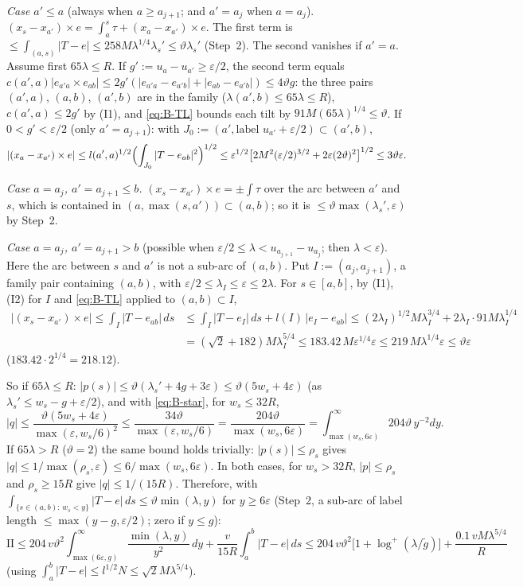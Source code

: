 \emph{Case $a'\le a$} (always when $a\ge a_{j+1}$; and $a'=a_j$ when $a=a_j$).
$(x_s-x_{a'})\times e=\int_a^s\tau+(x_a-x_{a'})\times e$. The first term is
$\le\int_{(a,s)}|T-e|\le258M\lambda^{1/4}\lambda_s'\le\vartheta\lambda_s'$ (Step~2). The second vanishes if $a'=a$. Assume first
$65\lambda\le R$. If $g':=u_a-u_{a'}\ge\varepsilon/2$, the second term equals
$c(a',a)|e_{a'a}\times e_{ab}|\le2g'(|e_{a'a}-e_{a'b}|+|e_{ab}-e_{a'b}|)\le4\vartheta g$: the three pairs $(a',a)$, $(a,b)$, $(a',b)$
are in the family ($\lambda(a',b)\le65\lambda\le R$), $c(a',a)\le2g'$ by (I1), and \eqref{eq:B-TL} bounds each tilt by
$91M(65\lambda)^{1/4}\le\vartheta$. If $0<g'<\varepsilon/2$ (only $a'=a_{j+1}$): with $J_0:=(a',\text{label }u_{a'}+\varepsilon/2)
\subset(a',b)$,
\[
|(x_a-x_{a'})\times e|\le l(a',a)^{1/2}\Bigl(\int_{J_0}|T-e_{ab}|^2\Bigr)^{1/2}
\le\varepsilon^{1/2}\bigl[2M^2(\varepsilon/2)^{3/2}+2\varepsilon(2\vartheta)^2\bigr]^{1/2}\le3\vartheta\varepsilon .
\]

\emph{Case $a=a_j$, $a'=a_{j+1}\le b$.} $(x_s-x_{a'})\times e=\pm\int\tau$ over the arc between $a'$ and $s$, which is contained in
$(a,\max(s,a'))\subset(a,b)$; so it is $\le\vartheta\max(\lambda_s',\varepsilon)$ by Step~2.

\emph{Case $a=a_j$, $a'=a_{j+1}>b$} (possible when $\varepsilon/2\le\lambda<u_{a_{j+1}}-u_{a_j}$; then $\lambda<\varepsilon$). Here
the arc between $s$ and $a'$ is not a sub-arc of $(a,b)$. Put $I:=(a_j,a_{j+1})$, a family pair containing $(a,b)$, with
$\varepsilon/2\le\lambda_I\le\varepsilon\le2\lambda$. For $s\in[a,b]$, by (I1), (I2) for $I$ and \eqref{eq:B-TL} applied to
$(a,b)\subset I$,
\begin{align*}
|(x_s-x_{a'})\times e|\le\int_I|T-e_{ab}|\,ds&\le\int_I|T-e_I|\,ds+l(I)\,|e_I-e_{ab}|
\le(2\lambda_I)^{1/2}M\lambda_I^{3/4}+2\lambda_I\cdot91M\lambda_I^{1/4}\\
&=(\sqrt2+182)M\lambda_I^{5/4}\le183.42\,M\varepsilon^{1/4}\varepsilon\le219\,M\lambda^{1/4}\varepsilon\le\vartheta\varepsilon
\end{align*}
($183.42\cdot2^{1/4}=218.12$).

So if $65\lambda\le R$: $|p(s)|\le\vartheta(\lambda_s'+4g+3\varepsilon)\le\vartheta(5w_s+4\varepsilon)$ (as
$\lambda_s'\le w_s-g+\varepsilon/2$), and with \eqref{eq:B-star}, for $w_s\le32R$,
\[
|q|\le\frac{\vartheta(5w_s+4\varepsilon)}{\max(\varepsilon,w_s/6)^2}\le\frac{34\vartheta}{\max(\varepsilon,w_s/6)}
=\frac{204\vartheta}{\max(w_s,6\varepsilon)}=\int_{\max(w_s,6\varepsilon)}^\infty204\vartheta\,y^{-2}dy .
\]
If $65\lambda>R$ ($\vartheta=2$) the same bound holds trivially: $|p(s)|\le\rho_s$ gives
$|q|\le1/\max(\rho_s,\varepsilon)\le6/\max(w_s,6\varepsilon)$. In both cases, for $w_s>32R$, $|p|\le\rho_s$ and $\rho_s\ge15R$ give
$|q|\le1/(15R)$. Therefore, with $\int_{\{s\in(a,b):\,w_s<y\}}|T-e|\,ds\le\vartheta\min(\lambda,y)$ for $y\ge6\varepsilon$ (Step~2, a
sub-arc of label length $\le\max(y-g,\varepsilon/2)$; zero if $y\le g$):
\[
\mathrm{II}\le204\,v\vartheta^2\int_{\max(6\varepsilon,g)}^\infty\frac{\min(\lambda,y)}{y^2}\,dy+\frac v{15R}\int_a^b|T-e|\,ds
\le204\,v\vartheta^2\bigl[1+\log^+(\lambda/\tilde g)\bigr]+\frac{0.1\,vM\lambda^{5/4}}R
\]
(using $\int_a^b|T-e|\le l^{1/2}N\le\sqrt2M\lambda^{5/4}$).

